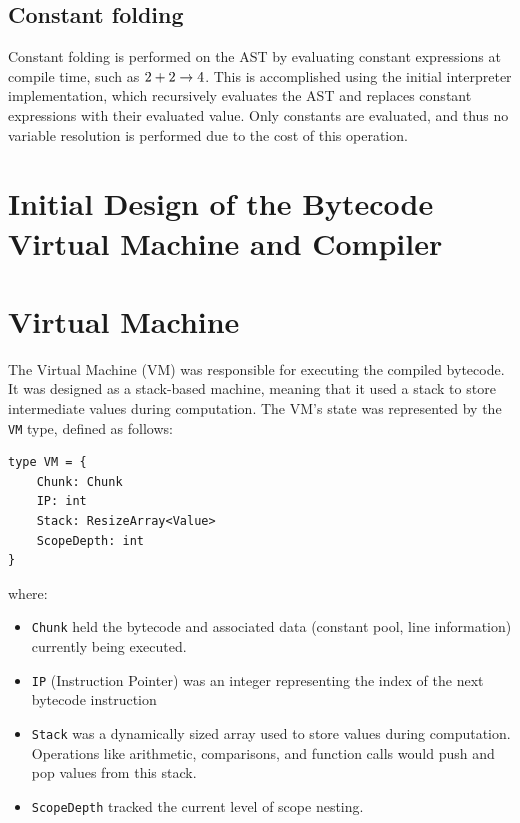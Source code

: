 \subsection{Constant folding}\label{subsec:constant-folding}

Constant folding is performed on the AST by evaluating constant expressions at compile time, such as $2 + 2 \rightarrow 4$.
This is accomplished using the initial interpreter implementation, which recursively evaluates the AST and replaces
constant expressions with their evaluated value.
Only constants are evaluated, and thus no variable resolution is performed due to the cost of this operation.

\section{Initial Design of the Bytecode Virtual Machine and Compiler}\label{sec:initial-design-of-the-bytecode-virtual-machine-and-compiler}



\section{Virtual Machine}\label{sec:virtual-machine2}

The Virtual Machine (VM) was responsible for executing the compiled bytecode. 
It was designed as a stack-based machine, meaning that it used a stack to store intermediate values during computation. 
The VM's state was represented by the \texttt{VM} type, defined as follows:

\begin{verbatim}
type VM = {
    Chunk: Chunk
    IP: int
    Stack: ResizeArray<Value>
    ScopeDepth: int  
}
\end{verbatim}

\noindent where:

\begin{itemize}
    \item \texttt{Chunk} held the bytecode and associated data (constant pool, line information) currently being executed.
    \item \texttt{IP} (Instruction Pointer) was an integer representing the index of the next bytecode instruction
    \item \texttt{Stack} was a dynamically sized array used to store values during computation.
    Operations like arithmetic, comparisons, and function calls would push and pop values from this stack.
    \item \texttt{ScopeDepth} tracked the current level of scope nesting.
\end{itemize}

